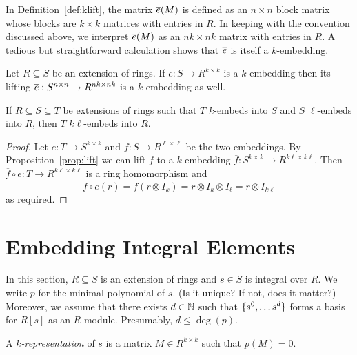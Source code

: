 \documentclass{article}
\begin{document}
In Definition~\ref{def:klift}, the matrix $\overline{e} (M)$ is defined as an
$n\times n$ block matrix whose blocks are $k\times k$ matrices with
entries in $R$. In keeping with the convention discussed above, we
interpret $\overline{e} (M)$ as an $nk \times nk$ matrix with entries in
$R$. A tedious but straightforward calculation shows that $\overline{e} $ is
itself a $k$-embedding.

\begin{proposition}
  \label{prop:lift}
  Let $R\subseteq S$ be an extension of rings. If $e:S\to R^{k\times
    k}$ is a $k$-embedding then its lifting $\overline{e} :S^{n\times n} \to
  R^{nk\times nk}$ is a $k$-embedding as well.
\end{proposition}

\begin{corollary}
  \label{cor:composition}
  If $R\subseteq S\subseteq T$ be extensions of rings such that $T$
  $k$-embeds into $S$ and $S$ $\ell$-embeds into $R$, then $T$
  $k\ell$-embeds into $R$.
\end{corollary}

\begin{proof}
  Let $e:T \to S^{k \times k}$ and $f:S\to R^{\ell \times \ell}$ be
  the two embeddings. By Proposition~\ref{prop:lift} we can lift $f$
  to a $k$-embedding $\overline{f}:S^{k\times k} \to R^{k\ell \times
    k\ell}$. Then $\overline{f}\circ e : T \to R^{k\ell \times k\ell}$
  is a ring homomorphism and
  \[
  \overline{f}\circ e (r) = \overline{f}(r\otimes I_k) = r\otimes I_k
  \otimes I_\ell = r\otimes I_{k\ell}
  \]
  as required.
\end{proof}

\section{Embedding Integral Elements}

In this section, $R\subseteq S$ is an extension of rings and $s\in S$
is integral over $R$. We write $p$ for the minimal polynomial of
$s$. (Is it unique? If not, does it matter?) Moreover, we assume that
there exists $d\in \mathbb{N}$ such that $\{s^0, \ldots s^d\}$ forms a basis
for $R[s]$ as an $R$-module. Presumably, $d\leq \deg(p)$.

\begin{definition}
  A \emph{$k$-representation} of $s$ is a matrix $M\in R^{k\times k}$
  such that $p(M)=0$.
\end{definition}
\end{document}

